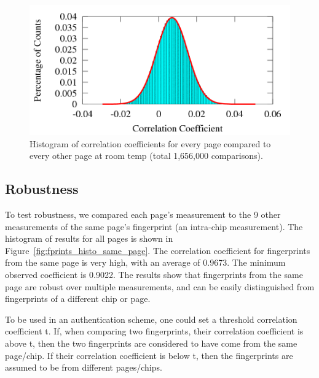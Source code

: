 \begin{figure}
\begin{center} 
\includegraphics[width=\mywidth]{figs/fprints_histo_diff_page.png} 
\caption{Histogram of correlation coefficients for every page compared to every other page at room temp (total 1,656,000 comparisons).}
\label{fig:fprints_histo_diff_page} 
\vspace{-0.1in}
\end{center} 
\end{figure} 

\subsection{Robustness}

To test robustness, we compared each page’s measurement to the 9 other measurements of the same page’s fingerprint (an intra-chip measurement). The histogram of results for all pages is shown in Figure~\ref{fig:fprints_histo_same_page}. The correlation coefficient for fingerprints from the same page is very high, with an average of 0.9673. The minimum observed coefficient is 0.9022. The results show that fingerprints from the same page are robust over multiple measurements, and can be easily distinguished from fingerprints of a different chip or page. 

To be used in an authentication scheme, one could set a threshold correlation coefficient t. If, when comparing two fingerprints, their correlation coefficient is above t, then the two fingerprints are considered to have come from the same page/chip. If their correlation coefficient is below t, then the fingerprints are assumed to be from different pages/chips. 

